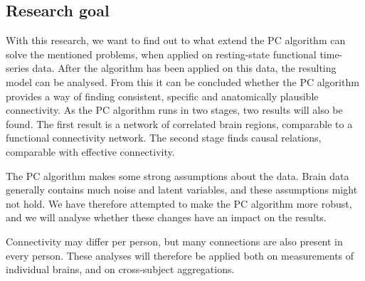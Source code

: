 \documentclass[a4paper, 10pt, english, onecolumn]{article}
\begin{document}
\subsection{Research goal}
With this research, we want to find out to what extend the PC algorithm can solve the mentioned problems, when applied on resting-state functional time-series data. 
After the algorithm has been applied on this data, the resulting model can be analysed.
From this it can be concluded whether the PC algorithm provides a way of finding consistent, specific and anatomically plausible connectivity.
As the PC algorithm runs in two stages, two results will also be found.
The first result is a network of correlated brain regions, comparable to a functional connectivity network.
The second stage finds causal relations, comparable with effective connectivity.

The PC algorithm makes some strong assumptions about the data.
Brain data generally contains much noise and latent variables, and these assumptions might not hold.
We have therefore attempted to make the PC algorithm more robust, and we will analyse whether these changes have an impact on the results.

Connectivity may differ per person, but many connections are also present in every person. These analyses will therefore be applied both on measurements of individual brains, and on cross-subject aggregations.


\end{document}
